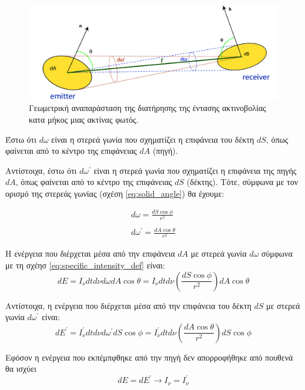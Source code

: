 \begin{figure}[h]
    \centering
    \includegraphics[width=\linewidth]{Figures/intensity_invariance.png}
    \caption{Γεωμετρική αναπαράσταση της διατήρησης της έντασης ακτινοβολίας κατα μήκος μιας ακτίνας φωτός.}
    \label{fig:intensity_invariance}
\end{figure}

Έστω ότι $d\omega$ είναι η στερεά γωνία που σχηματίζει η επιφάνεια του δέκτη $dS$, όπως φαίνεται από το κέντρο της επιφάνειας $dA$ (πηγή).

Αντίστοιχα, έστω ότι $d \omega^{\prime}$ είναι η στερεά γωνία που σχηματίζει η επιφάνεια της πηγής $dA$, όπως φαίνεται από το κέντρο της επιφάνειας $dS$ (δέκτης). Τότε, σύμφωνα με τον ορισμό της στερεάς γωνίας (σχέση \eqref{eq:solid_angle}) θα έχουμε:

\begin{eqnarray*}
    d\omega = \frac{dS \cos \phi}{r^2} \\ \\
    d\omega^{\prime} = \frac{dA \cos \theta}{r^2}
\end{eqnarray*}

Η ενέργεια που διέρχεται μέσα από την επιφάνεια $dA$ με στερεά γωνία $d\omega$ σύμφωνα με τη σχέησ \eqref{eq:specific_intensity_def} είναι:
\begin{equation*}
    dE = I_{\nu} dt d\nu d\omega dA \cos \theta = I_{\nu} dt d\nu \left( \frac{dS \cos \phi}{r^2} \right) dA \cos \theta
\end{equation*}

Αντίστοιχα, η ενέργεια που διέρχεται μέσα από την επιφάνεια του δέκτη $dS$ με στερεά γωνία $d\omega^{\prime}$ είναι:
\begin{equation*}
    dE^{\prime} = I_{\nu}^{\prime} dt d\nu d\omega^{\prime} dS \cos \phi = I_{\nu}^{\prime} dt d\nu \left( \frac{dA \cos \theta}{r^2} \right) dS \cos \phi
\end{equation*}

Εφόσον η ενέργεια που εκπέμπφθηκε από την πηγή δεν απορροφήθηκε από πουθενά θα ισχύει $$dE = dE^{\prime} \longrightarrow I_{\nu} = I_{\nu}^{\prime}$$

